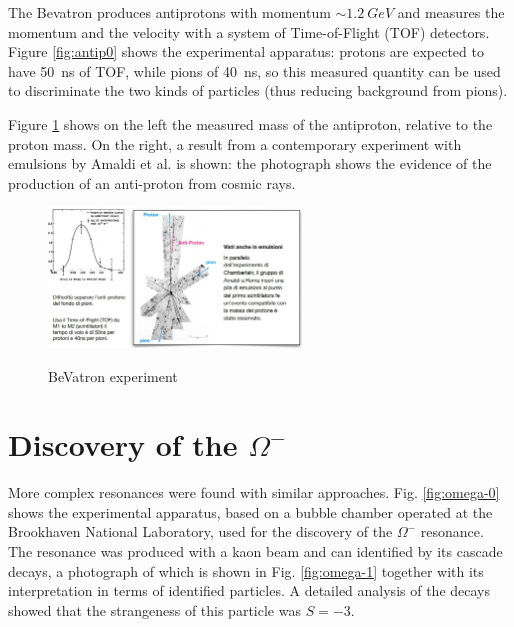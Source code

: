 The Bevatron produces antiprotons with momentum $\sim 1.2 \ GeV$ and measures the momentum and the velocity with a system of Time-of-Flight (TOF) detectors. Figure \ref{fig:antip0} shows the experimental apparatus: protons are expected to have \SI{50}{ns} of TOF, while pions of \SI{40}{ns}, so this measured quantity can be used to discriminate the two kinds of particles (thus reducing background from pions).

Figure \ref{fig:antip1} shows on the left the measured mass of the antiproton, relative to the proton mass. On the right, a result from a contemporary experiment with emulsions by Amaldi et al. is shown: the photograph shows the evidence of the production of an anti-proton from cosmic rays.


\begin{figure}[!h]
    \centering
    \includegraphics[width=0.6\textwidth]{Figures/FNSN31_10.JPG}
    \label{fig:antip1}
    \caption{BeVatron experiment}
\end{figure}

\section{Discovery of the $\Omega^-$}
More complex resonances were found with similar approaches. Fig. \ref{fig:omega-0} shows the experimental apparatus, based on a bubble chamber operated at the Brookhaven National Laboratory, used for the discovery of the $\Omega^-$ resonance. The resonance was produced with a kaon beam and can identified by its cascade decays, a photograph of which is shown in Fig. \ref{fig:omega-1} together with its interpretation in terms of identified particles. A detailed analysis of the decays showed that the strangeness of this particle was $S=-3$.

